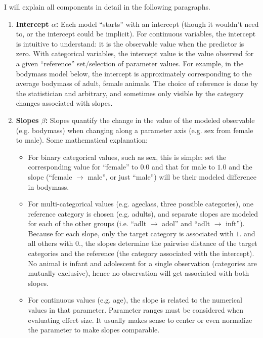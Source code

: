 I will explain all components in detail in the following paragraphs.

\begin{enumerate}
\item \textbf{Intercept \(\alpha\):}
\label{sec:org034f04c}
Each model ``starts'' with an intercept (though it wouldn't need to, or the intercept could be implicit).
For continuous variables, the intercept is intuitive to understand: it is the observable value when the predictor is zero.
With categorical variables, the intercept value is the value observed for a given ``reference'' set/selection of parameter values.
For example, in the bodymass model below, the intercept is approximately corresponding to the average bodymass of adult, female animals.
The choice of reference is done by the statistician and arbitrary, and sometimes only visible by the category changes associated with slopes.

\item \textbf{Slopes \(\beta\):}
\label{sec:org2c291e4}
Slopes quantify the change in the value of the modeled observable (e.g. bodymass) when changing along a parameter axis (e.g. sex from female to male).
Some mathematical explanation:
\begin{itemize}
\item For binary categorical values, such as sex, this is simple: set the corresponding value for ``female'' to \(0.0\) and that for male to \(1.0\) and the slope (``female \(\rightarrow\) male'', or just ``male'') will be their modeled difference in bodymass.
\item For multi-categorical values (e.g. ageclass, three possible categories), one reference category is chosen (e.g. adults), and separate slopes are modeled for each of the other groups (i.e. ``adlt \(\rightarrow\) adol'' and ``adlt \(\rightarrow\) inft''). Because for each slope, only the target category is associated with \(1.\) and all others with \(0.\), the slopes determine the pairwise distance of the target categories and the reference (the category associated with the intercept). No animal is infant and adolescent for a single observation (categories are mutually exclusive), hence no observation will get associated with both slopes.
\item For continuous values (e.g. age), the slope is related to the numerical values in that parameter. Parameter ranges must be considered when evaluating effect size. It usually makes sense to center or even normalize the parameter to make slopes comparable.
\end{itemize}


\end{enumerate}
